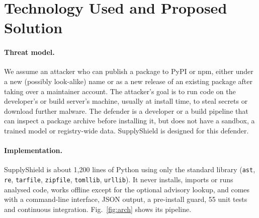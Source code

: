 \documentclass[runningheads]{llncs}
\begin{document}
\section{Technology Used and Proposed Solution}\label{sec:tech}

\paragraph{Threat model.} We assume an attacker who can publish a package to PyPI or npm, either under a new (possibly look-alike) name or as a new release of an existing package after taking over a maintainer account. The attacker's goal is to run code on the developer's or build server's machine, usually at install time, to steal secrets or download further malware. The defender is a developer or a build pipeline that can inspect a package archive before installing it, but does not have a sandbox, a trained model or registry-wide data. SupplyShield is designed for this defender.

\paragraph{Implementation.} SupplyShield is about 1{,}200 lines of Python using only the standard library (\texttt{ast}, \texttt{re}, \texttt{tarfile}, \texttt{zipfile}, \texttt{tomllib}, \texttt{urllib}). It never installs, imports or runs analysed code, works offline except for the optional advisory lookup, and comes with a command-line interface, JSON output, a pre-install guard, 55 unit tests and continuous integration. Fig.~\ref{fig:arch} shows its pipeline.
\end{document}
